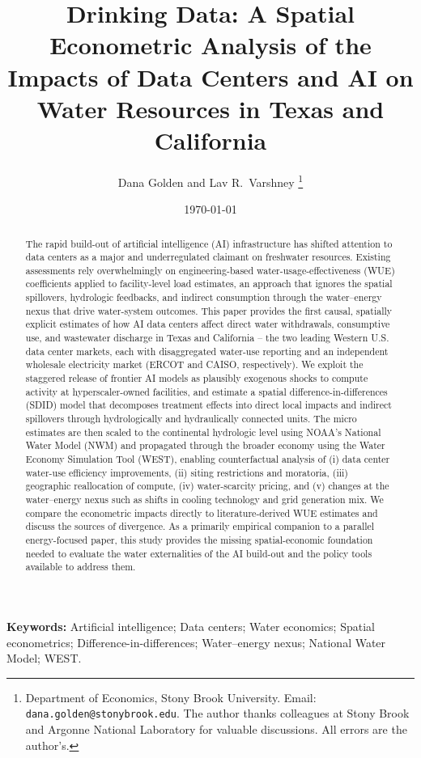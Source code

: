 \documentclass[11pt, letterpaper]{article}
\title{\textbf{Drinking Data: A Spatial Econometric Analysis of the Impacts of Data Centers and AI on Water Resources in Texas and California}}
\author{Dana Golden and Lav R.\ Varshney \thanks{Department of Economics, Stony Brook University. Email: \texttt{dana.golden@stonybrook.edu}. The author thanks colleagues at Stony Brook and Argonne National Laboratory for valuable discussions. All errors are the author's.}}
\date{\today}
\begin{document}
\maketitle

\begin{abstract}
\noindent The rapid build-out of artificial intelligence (AI) infrastructure has shifted attention to data centers as a major and underregulated claimant on freshwater resources. Existing assessments rely overwhelmingly on engineering-based water-usage-effectiveness (WUE) coefficients applied to facility-level load estimates, an approach that ignores the spatial spillovers, hydrologic feedbacks, and indirect consumption through the water--energy nexus that drive water-system outcomes. This paper provides the first causal, spatially explicit estimates of how AI data centers affect direct water withdrawals, consumptive use, and wastewater discharge in Texas and California -- the two leading Western U.S. data center markets, each with disaggregated water-use reporting and an independent wholesale electricity market (ERCOT and CAISO, respectively). We exploit the staggered release of frontier AI models as plausibly exogenous shocks to compute activity at hyperscaler-owned facilities, and estimate a spatial difference-in-differences (SDID) model that decomposes treatment effects into direct local impacts and indirect spillovers through hydrologically and hydraulically connected units. The micro estimates are then scaled to the continental hydrologic level using NOAA's National Water Model (NWM) and propagated through the broader economy using the Water Economy Simulation Tool (WEST), enabling counterfactual analysis of (i) data center water-use efficiency improvements, (ii) siting restrictions and moratoria, (iii) geographic reallocation of compute, (iv) water-scarcity pricing, and (v) changes at the water--energy nexus such as shifts in cooling technology and grid generation mix. We compare the econometric impacts directly to literature-derived WUE estimates and discuss the sources of divergence. As a primarily empirical companion to a parallel energy-focused paper, this study provides the missing spatial-economic foundation needed to evaluate the water externalities of the AI build-out and the policy tools available to address them.
\end{abstract}

\noindent \textbf{Keywords:} Artificial intelligence; Data centers; Water economics; Spatial econometrics; Difference-in-differences; Water--energy nexus; National Water Model; WEST.
\end{document}
